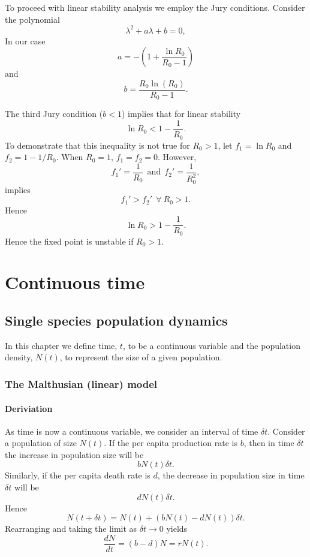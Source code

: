 \documentclass[
  letterpaper,
  DIV=11,
  numbers=noendperiod]{scrreprt}
\begin{document}
To proceed with linear stability analysis we employ the Jury conditions.
Consider the polynomial \[
\lambda^2+a\lambda+b=0,
\] In our case \[
a= - (1+\frac{\ln R_0}{R_0-1}) 
\] and \[
b=\frac{R_0\ln(R_0)}{R_0-1}.
\]

The third Jury condition (\(b<1\)) implies that for linear stability \[
\ln R_0 < 1-\frac{1}{R_0}.
\] To demonstrate that this inequality is not true for \(R_0>1\), let
\(f_1=\ln R_0\) and \(f_2=1- 1/R_0\). When \(R_0=1\), \(f_1=f_2=0\).
However, \[
f_1'=\frac{1}{R_0}  \ \ \textrm{and} \ \ f_2'=\frac{1}{R_0^2},
\] implies \[
f_1'>f_2'  \ \ \forall \ R_0>1.
\] Hence \[
\ln R_0 > 1-\frac{1}{R_0}.
\] Hence the fixed point is unstable if \(R_0>1\).

\part{Continuous time}

\hypertarget{single-species-population-dynamics-1}{%
\chapter{Single species population
dynamics}\label{single-species-population-dynamics-1}}

In this chapter we define time, \(t\), to be a continuous variable and
the population density, \(N(t)\), to represent the size of a given
population.

\hypertarget{the-malthusian-linear-model}{%
\section{The Malthusian (linear)
model}\label{the-malthusian-linear-model}}

\hypertarget{deriviation}{%
\subsection{Deriviation}\label{deriviation}}

As time is now a continuous variable, we consider an interval of time
\(\delta t\). Consider a population of size \(N(t)\). If the per capita
production rate is \(b\), then in time \(\delta t\) the increase in
population size will be \[
b N(t) \delta t.
\] Similarly, if the per capita death rate is \(d\), the decrease in
population size in time \(\delta t\) will be \[
d N(t) \delta t.
\] Hence \[
N(t+\delta t)= N(t) + (bN(t)-dN(t))\delta t.
\] Rearranging and taking the limit as \(\delta t \rightarrow 0\) yields
\[
\frac{dN}{dt}=(b-d)N=rN(t).
\]
\end{document}
